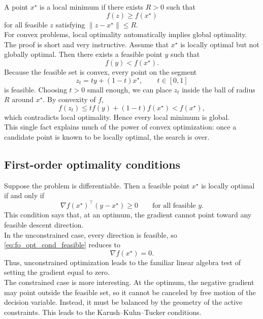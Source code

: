 A point $x^\star$ is a local minimum if there exists $R>0$ such that
$$
    f(z) \geq f(x^\star)
$$
for all feasible $z$ satisfying $\|z-x^\star\| \leq R$.\\
For convex problems, local optimality automatically implies global optimality. The proof is short and very instructive. Assume that $x^\star$ is locally optimal but not globally optimal. Then there exists a feasible point $y$ such that
$$
    f(y) < f(x^\star).
$$
Because the feasible set is convex, every point on the segment
$$
    z_t = ty + (1-t)x^\star, \qquad t \in [0,1]
$$
is feasible. Choosing $t>0$ small enough, we can place $z_t$ inside the ball of radius $R$ around $x^\star$. By convexity of $f$,
$$
    f(z_t) \leq t f(y) + (1-t) f(x^\star) < f(x^\star),
$$
which contradicts local optimality. Hence every local minimum is global.\\
This single fact explains much of the power of convex optimization: once a candidate point is known to be locally optimal, the search is over.

\subsection{First-order optimality conditions}

Suppose the problem is differentiable. Then a feasible point $x^\star$ is locally optimal if and only if
\begin{equation}
    \nabla f(x^\star)^\top (y-x^\star) \geq 0
    \qquad \text{for all feasible } y.
    \label{eq:fo_opt_cond_feasible}
\end{equation}
This condition says that, at an optimum, the gradient cannot point toward any feasible descent direction.\\
In the unconstrained case, every direction is feasible, so \eqref{eq:fo_opt_cond_feasible} reduces to
$$
    \nabla f(x^\star)=0.
$$
Thus, unconstrained optimization leads to the familiar linear algebra test of setting the gradient equal to zero.\\
The constrained case is more interesting. At the optimum, the negative gradient may point outside the feasible set, so it cannot be canceled by free motion of the decision variable. Instead, it must be balanced by the geometry of the active constraints. This leads to the Karush--Kuhn--Tucker conditions.

